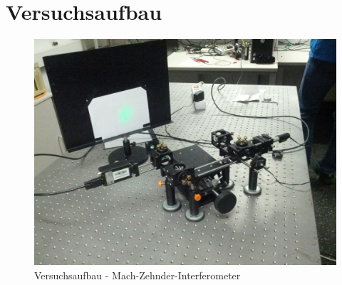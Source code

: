 \section{Versuchsaufbau}

\begin{figure}[h!]
	\includegraphics[width=\linewidth]{img/interferometer_aufbau}
	\caption{Versuchsaufbau - Mach-Zehnder-Interferometer}
	\label{fig:aufbau}	
\end{figure}
